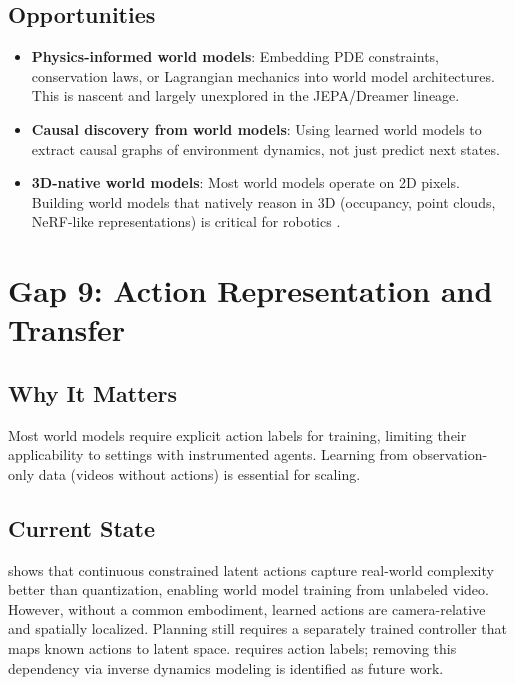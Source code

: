 \documentclass[11pt,a4paper]{article}
\begin{document}
\subsection{Opportunities}
\begin{itemize}[noitemsep]
    \item \textbf{Physics-informed world models}: Embedding PDE constraints, conservation laws, or Lagrangian mechanics into world model architectures. This is nascent and largely unexplored in the JEPA/Dreamer lineage.
    \item \textbf{Causal discovery from world models}: Using learned world models to extract causal graphs of environment dynamics, not just predict next states.
    \item \textbf{3D-native world models}: Most world models operate on 2D pixels. Building world models that natively reason in 3D (occupancy, point clouds, NeRF-like representations) is critical for robotics \citep{kong2025survey3d4d, zhu2026self}.
\end{itemize}

\section{Gap 9: Action Representation and Transfer}

\subsection{Why It Matters}
Most world models require explicit action labels for training, limiting their applicability to settings with instrumented agents. Learning from observation-only data (videos without actions) is essential for scaling.

\subsection{Current State}
\citet{garrido2026learning} shows that continuous constrained latent actions capture real-world complexity better than quantization, enabling world model training from unlabeled video. However, without a common embodiment, learned actions are camera-relative and spatially localized. Planning still requires a separately trained controller that maps known actions to latent space. \citet{maes2026leworldmodel} requires action labels; removing this dependency via inverse dynamics modeling is identified as future work.
\end{document}
